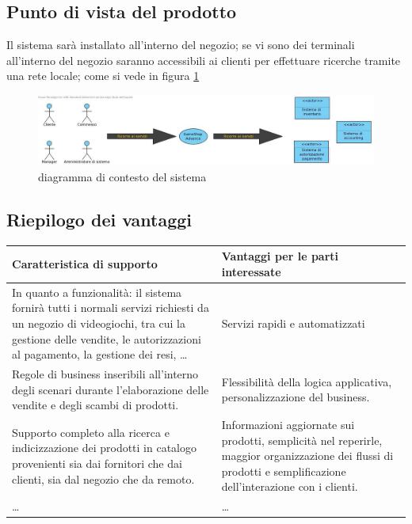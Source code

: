 \documentclass[a4paper,10pt]{report}
\begin{document}
  \subsection*{Punto di vista del prodotto}
  Il sistema sarà installato all'interno del negozio; se vi sono dei terminali all'interno del negozio
saranno accessibili ai clienti per effettuare ricerche tramite una rete locale; come si vede in figura \ref{fig:syscontext}
\begin{figure}
 \centering
 \includegraphics[width=.9\textwidth]{contesto-sistema.png}
 \caption{diagramma di contesto del sistema}
 \label{fig:syscontext}
\end{figure}

  \subsection*{Riepilogo dei vantaggi}
  \begin{tabular}{|p{}|p{}|}
   \hline
   \textbf{Caratteristica di supporto} & \textbf{Vantaggi per le parti interessate}\\
   \hline
   In quanto a funzionalità: il sistema fornirà tutti i normali servizi richiesti da un negozio di videogiochi, tra cui la gestione delle vendite, le autorizzazioni al pagamento, la gestione dei resi, \dots &
   Servizi rapidi e automatizzati\\
   \hline
   Regole di business inseribili all'interno degli
scenari durante l'elaborazione delle vendite e
degli scambi di prodotti. &
Flessibilità della logica applicativa,
personalizzazione del business.\\
\hline
Supporto completo alla ricerca e indicizzazione
dei prodotti in catalogo provenienti sia dai
fornitori che dai clienti, sia dal negozio che da
remoto.&
Informazioni aggiornate sui prodotti, semplicità
nel reperirle, maggior organizzazione dei flussi
di prodotti e semplificazione dell'interazione con
i clienti.\\
\hline
\dots & \dots\\
\hline
  \end{tabular}
\end{document}
